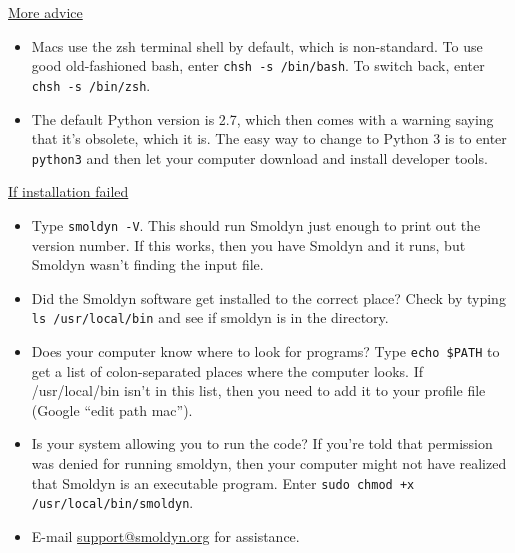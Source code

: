 \documentclass {book}
\newcommand {\ttt} {\texttt}
\begin{document}
\underline{More advice}
\begin{itemize}
\item Macs use the zsh terminal shell by default, which is non-standard. To use good old-fashioned bash, enter \ttt{chsh -s /bin/bash}. To switch back, enter \ttt{chsh -s /bin/zsh}.

\item The default Python version is 2.7, which then comes with a warning saying that it's obsolete, which it is. The easy way to change to Python 3 is to enter \ttt{python3} and then let your computer download and install developer tools.

\end{itemize}

\underline{If installation failed}

\begin{itemize}
\item Type \ttt{smoldyn -V}. This should run Smoldyn just enough to print out the version number. If this works, then you have Smoldyn and it runs, but Smoldyn wasn't finding the input file.

\item Did the Smoldyn software get installed to the correct place? Check by typing \ttt{ls /usr/local/bin} and see if smoldyn is in the directory.

\item Does your computer know where to look for programs? Type \ttt{echo \$PATH} to get a list of colon-separated places where the computer looks. If /usr/local/bin isn't in this list, then you need to add it to your profile file (Google ``edit path mac'').

\item Is your system allowing you to run the code? If you're told that permission was denied for running smoldyn, then your computer might not have realized that Smoldyn is an executable program. Enter \ttt{sudo chmod +x /usr/local/bin/smoldyn}.

\item E-mail \href{support@smoldyn.org}{support@smoldyn.org} for assistance.

\end{itemize}
\end{document}
